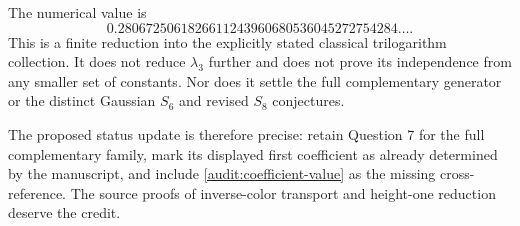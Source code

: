 The numerical value is
\[
 0.2806725061826611243960680536045272754284\ldots.
\]
This is a finite reduction into the explicitly stated classical
trilogarithm collection. It does not reduce $\lambda_3$ further and does
not prove its independence from any smaller set of constants. Nor does
it settle the full complementary generator or the distinct Gaussian
$S_6$ and revised $S_8$ conjectures.

The proposed status update is therefore precise: retain Question 7 for
the full complementary family, mark its displayed first coefficient as
already determined by the manuscript, and include
\eqref{audit:coefficient-value} as the missing cross-reference. The source
proofs of inverse-color transport and height-one reduction deserve the
credit.
